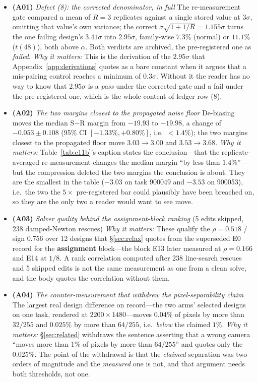 \documentclass{article}
\begin{document}
\begin{itemize}\itemsep1.5pt
\item \textbf{(A01)} \emph{Defect (8): the corrected denominator, in full}  The re-measurement gate compared a mean of $R=3$ replicates against a single stored value at $3\sigma$, omitting that value's own variance; the correct $\sigma\sqrt{1 + 1/R} = 1.155\sigma$ turns the one failing design's $3.41\sigma$ into $2.95\sigma$, family-wise $7.3\%$ (normal) or $11.1\%$ ($t(48)$), both above $\alpha$.  Both verdicts are archived, the pre-registered one as \emph{failed}.  \emph{Why it matters:} This is the derivation of the $2.95\sigma$ that Appendix~\ref{app:derivations} quotes as a bare constant when it argues that a mis-pairing control reaches a minimum of $0.3\sigma$.  Without it the reader has no way to know that $2.95\sigma$ is a \emph{pass} under the corrected gate and a fail under the pre-registered one, which is the whole content of ledger row (8).
\item \textbf{(A02)} \emph{The two margins closest to the propagated noise floor}  De-biasing moves the median S$-$R margin from $-19.93$ to $-19.98$, a change of $-0.053 \pm 0.108$ (95\% CI $[-1.33\%, +0.80\%]$, i.e.\ $<1.4\%$); the two margins closest to the propagated floor move $3.03 \to 3.00$ and $3.53 \to 3.68$.  \emph{Why it matters:} Table~\ref{tab:e11b}'s caption states the conclusion---that the replicate-averaged re-measurement changes the median margin ``by less than $1.4\%$''---but the compression deleted the two margins the conclusion is about.  They are the smallest in the table ($-3.03$ on task 900049 and $-3.53$ on 900053), i.e.\ the two the $5\times$ pre-registered bar could plausibly have been breached on, so they are the only two a reader would want to see move.
\item \textbf{(A03)} \emph{Solver quality behind the assignment-block ranking}  (5 edits skipped, 238 damped-Newton rescues)  \emph{Why it matters:} These qualify the $\rho = 0.518$ / sign $0.756$ over 12 designs that \S\ref{sec:relax} quotes from the superseded E0 record for the \textbf{assignment} block---the block E13 later measured at $\rho = 0.166$ and E14 at $1/8$.  A rank correlation computed after 238 line-search rescues and 5 skipped edits is not the same measurement as one from a clean solve, and the body quotes the correlation without them.
\item \textbf{(A04)} \emph{The counter-measurement that withdrew the pixel-separability claim}  The largest real design difference on record---the two arms' selected designs on one task, rendered at $2200\times1480$---moves $0.04\%$ of pixels by more than $32/255$ and $0.025\%$ by more than $64/255$, i.e.\ \emph{below} the claimed $1\%$.  \emph{Why it matters:} \S\ref{sec:related} withdraws the sentence asserting that a wrong camera ``moves more than $1\%$ of pixels by more than $64/255$'' and quotes only the $0.025\%$.  The point of the withdrawal is that the \emph{claimed} separation was two orders of magnitude and the \emph{measured} one is not, and that argument needs both thresholds, not one.

\end{itemize}
\end{document}

